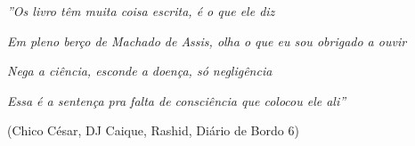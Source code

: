 
\begin{epigrafe}

\emph{''Os livro têm muita coisa escrita, é o que ele diz}

\emph{Em pleno berço de Machado de Assis, olha o que eu sou obrigado a ouvir}

\emph{Nega a ciência, esconde a doença, só negligência}

\emph{Essa é a sentença pra falta de consciência que colocou ele ali''}

(Chico César, DJ Caique, Rashid, Diário de Bordo 6)

\end{epigrafe}

